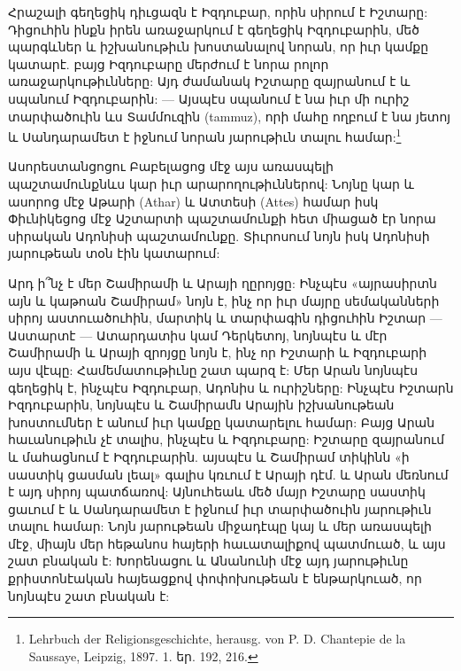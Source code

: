 \documentclass{article}
\begin{document}
{Հրաշալի գեղեցիկ դիւցազն է Իզդուբար, որին սիրում է Իշտարը: Դիցուհին ինքն իրեն առաջարկում է գեղեցիկ Իզդուբարին, մեծ պարգևներ և իշխանութիւն խոստանալով նորան, որ իւր կամքը կատարէ. բայց Իզդուբարը մերժում է նորա րոլոր առաջարկութիւնները: Այդ ժամանակ Իշտարը զայրանում է և սպանում Իզդուբարին: — Այսպէս սպանում է նա իւր մի ուրիշ տարփածուին ևս Տամմուզին (tammuz), որի մահը ողբում է նա յետոյ և Սանդարամետ է իջնում նորան յարութիւն տալու համար:\footnote{Lehrbuch der Religionsgeschichte, herausg. von P. D. Chantepie de la Saussaye, Leipzig, 1897. 1. եր. 192, 216.}

Ասորեստանցոցու Բաբելացոց մէջ այս առասպելի պաշտամունքնևս կար իւր արարողութիւններով: Նոյնը կար և ասորոց մէջ Աթարի (Athar) և Ատտեսի (Attes) համար իսկ Փիւնիկեցոց մէջ Աշտարտի պաշտամունքի հետ միացած էր նորա սիրական Ադոնիսի պաշտամունքը. Տիւրոսում նոյն իսկ Ադոնիսի յարութեան տօն էին կատարում:

Արդ ի՞նչ է մեր Շամիրամի և Արայի ղըրոյցը: Ինչպէս «այրասիրտն այն և կաթոան Շամիրամ» նոյն է, ինչ որ իւր մայրը սեմականների սիրոյ աստուածուհին, մարտիկ և տարփագին դիցուհին Իշտար — Աստարտէ — Ատարդատիս կամ Դերկետոյ, նոյնպէս և մէր Շամիրամի և Արայի զրոյցը նոյն է, ինչ որ Իշտարի և Իզդուբարի այս վէպը: Համեմատութիւնը շատ պարզ է: Մեր Արան նոյնպէս գեղեցիկ է, ինչպէս Իզդուբար, Ադոնիս և ուրիշները: Ինչպէս Իշտարն Իզդուբարին, նոյնպէս և Շամիրամն Արային իշխանութեան խոստումներ է անում իւր կամքը կատարելու համար: Բայց Արան հաւանութիւն չէ տալիս, ինչպէս և Իզդուբարը: Իշտարը զայրանում և մահացնում է Իզդուբարին. այսպէս և Շամիրամ տիկինն «ի սաստիկ ցասման լեալ» գալիս կռւում է Արայի դէմ. և Արան մեռնում է այդ սիրոյ պատճառով: Այնուհեաև մեծ մայր Իշտարը սաստիկ ցաւում է և Սանդարամետ է իջնում իւր տարփածուին յարութիւն տալու համար: Նոյն յարութեան միջադէպը կայ և մեր առասպելի մէջ, միայն մեր հեթանոս հայերի հաւատալիքով պատմուած, և այս շատ բնական է: Խորենացու և Անանունի մէջ այդ յարութիւնը քրիստոնէական հայեացքով փոփոխութեան է ենթարկուած, որ նոյնպէս շատ բնական է:

}
\end{document}
